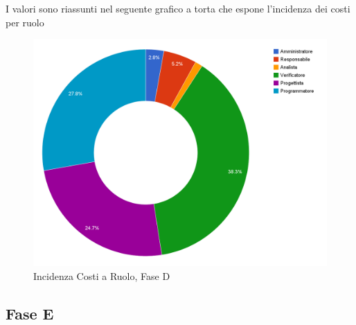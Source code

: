 I valori sono riassunti nel seguente grafico a torta che espone l'incidenza dei costi per ruolo
\begin{figure}[h]
	\centering
	\includegraphics[width=0.8\linewidth]{./content/Immagini/prospetti/costiPrDe.png}
	\caption{Incidenza Costi a Ruolo, Fase D}
\end{figure}
\pagebreak
\subsection{Fase E}
\label{VerificaValidazioneLav}
